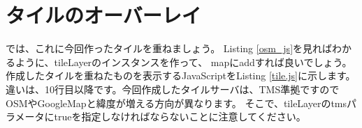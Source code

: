 \section*{タイルのオーバーレイ}
      
では、これに今回作ったタイルを重ねましょう。
Listing \ref{osm_js}を見ればわかるように、tileLayerのインスタンスを作って、
mapにaddすれば良いでしょう。作成したタイルを重ねたものを表示するJavaScriptをListing \ref{tile.js}に示します。
違いは、10行目以降です。今回作成したタイルサーバは、TMS準拠ですので
OSMやGoogleMapと緯度が増える方向が異なります。
そこで、tileLayerのtmsパラメータにtrueを指定しなければならないことに注意してください。


